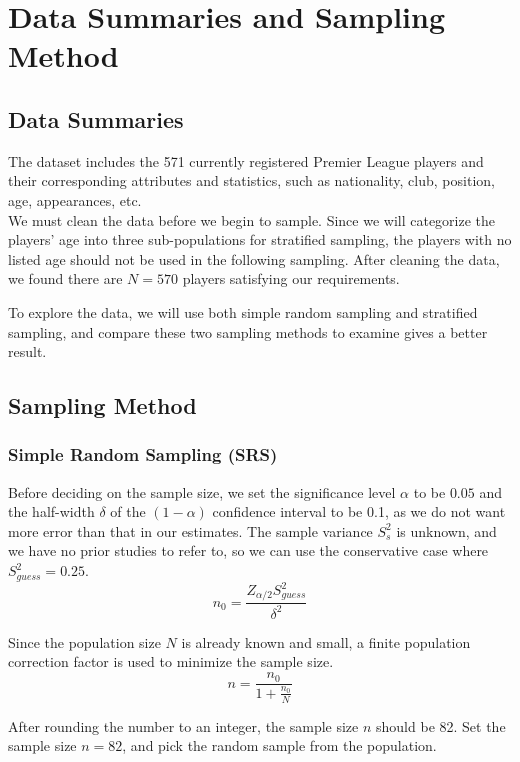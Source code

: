 \documentclass[paper=a4, fontsize=12pt,twoside]{article}	%
\begin{document}
\section{Data Summaries and Sampling Method}
\subsection{Data Summaries}
The dataset includes the 571 currently registered Premier League players and their corresponding attributes and statistics, such as nationality, club, position, age, appearances, etc.\\ 

\noindent We must clean the data before we begin to sample. Since we will categorize the players' age into three sub-populations for stratified sampling, the players with no listed age should not be used in the following sampling. After cleaning the data, we found there are $N=570$ players satisfying our requirements.

\vspace{2mm}
\noindent To explore the data, we will use both simple random sampling and stratified sampling, and compare these two sampling methods to examine gives a better result.

\vspace{2mm}
\subsection{Sampling Method}
\subsubsection{Simple Random Sampling (SRS)}

\vspace{2mm}
Before deciding on the sample size, we set the significance level $\alpha$ to be $0.05$ and the half-width $\delta$ of the $(1-\alpha)$ confidence interval to be 0.1, as we do not want more error than that in our estimates. The sample variance $S_s^2$ is unknown, and we have no prior studies to refer to, so we can use the conservative case where $S_{guess}^2=0.25$. 
$$n_0=\frac{Z_{\alpha/2}S_{guess}^2}{\delta^2}$$

\noindent Since the population size $N$ is already known and small, a finite population correction factor is used to minimize the sample size.
$$n=\frac{n_0}{1+\frac{n_0}{N}}$$

\noindent After rounding the number to an integer, the sample size $n$ should be 82. Set the sample size $n = 82$, and pick the random sample from the population.
\end{document}
